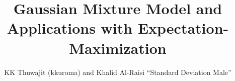 \documentclass{article}
\title{Gaussian Mixture Model and Applications with Expectation-Maximization}
\author{KK Thuwajit (kkuroma) and Khalid Al-Raisi ``Standard Deviation Male''}
\begin{document}
\newtheorem{theorem}{Theorem}
\newtheorem{lemma}{Lemma}
\theoremstyle{definition}
\newtheorem{definition}{Definition}
\newtheorem{example}{Example}
\maketitle
\tableofcontents
\newpage









\end{document}
